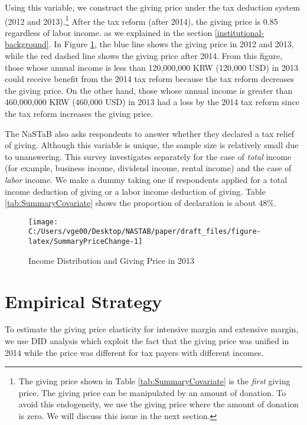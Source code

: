 \documentclass[
  11pt,
  a4paper,
]{article}
\begin{document}
Using this variable, we construct the giving price under the tax deduction system (2012 and 2013).\footnote{The giving price shown in Table \ref{tab:SummaryCovariate} is the \emph{first} giving price. The giving price can be manipulated by an amount of donation. To avoid this endogeneity, we use the giving price where the amount of donation is zero. We will discuss this issue in the next section.}
After the tax reform (after 2014), the giving price is 0.85 regardless of labor income.
as we explained in the section \ref{institutional-background}.
In Figure \ref{fig:SummaryPriceChange},
the blue line shows the giving price in 2012 and 2013,
while the red dashed line shows the giving price after 2014.
From this figure,
those whose annual income is less than 120,000,000 KRW (120,000 USD) in 2013 could receive benefit from the 2014 tax reform
because the tax reform decreases the giving price.
On the other hand,
those whose annual income is greater than 460,000,000 KRW (460,000 USD) in 2013 had a loss by the 2014 tax reform
since the tax reform increases the giving price.

The NaSTaB also asks respondents to answer whether they declared a tax relief of giving.
Although this variable is unique, the sample size is relatively small due to unanswering.
This survey investigates separately for the case of \emph{total} income (for example, business income, dividend income, rental income)
and the case of \emph{labor} income.
We make a dummy taking one if respondents applied for a total income deduction of giving
or a labor income deduction of giving.
Table \ref{tab:SummaryCovariate} shows the proportion of declaration is about 48\%.

\begin{figure}[t]

{\centering \texttt{[image: C:/Users/vge00/Desktop/NASTAB/paper/draft\_files/figure-latex/SummaryPriceChange-1]} 

}

\caption{Income Distribution and Giving Price in 2013}\label{fig:SummaryPriceChange}
\end{figure}

\hypertarget{empirical-strategy}{%
\section{Empirical Strategy}\label{empirical-strategy}}

To estimate the giving price elasticity for intensive margin and extensive margin, we use DID analysis which exploit the fact that the giving price was unified in 2014 while the price was different for tax payers with different incomes.
\end{document}
